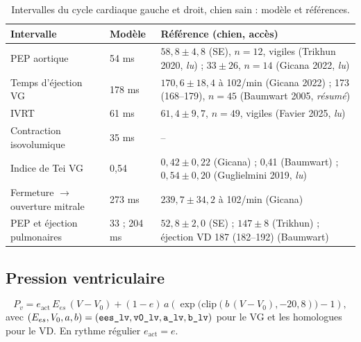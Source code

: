 \documentclass[10pt,a4paper]{article}
\newcommand{\vp}[1]{\text{\texttt{\detokenize{#1}}}}
\newcommand{\acc}[1]{\textsl{#1}}
\begin{document}
\begin{table}[h]\centering\small
\caption{Intervalles du cycle cardiaque gauche et droit, chien sain : modèle et références.}\label{tab:sti}
\begin{tabularx}{\linewidth}{@{}llL@{}}
\toprule
Intervalle & Modèle & Référence (chien, accès)\\
\midrule
PEP aortique & 54 ms & $58{,}8 \pm 4{,}8$ (SE), $n = 12$, vigiles (Trikhun 2020, \acc{lu}) ; $33 \pm 26$, $n = 14$ (Gicana 2022, \acc{lu})\\
Temps d'éjection VG & 178 ms & $170{,}6 \pm 18{,}4$ à 102/min (Gicana 2022) ; 173 (168--179), $n = 45$ (Baumwart 2005, \acc{résumé})\\
IVRT & 61 ms & $61{,}4 \pm 9{,}7$, $n = 49$, vigiles (Favier 2025, \acc{lu})\\
Contraction isovolumique & 35 ms & --\\
Indice de Tei VG & 0,54 & $0{,}42 \pm 0{,}22$ (Gicana) ; 0,41 (Baumwart) ; $0{,}54 \pm 0{,}20$ (Guglielmini 2019, \acc{lu})\\
Fermeture $\to$ ouverture mitrale & 273 ms & $239{,}7 \pm 34{,}2$ à 102/min (Gicana)\\
PEP et éjection pulmonaires & 33 ; 204 ms & $52{,}8 \pm 2{,}0$ (SE) ; $147 \pm 8$ (Trikhun) ; éjection VD 187 (182--192) (Baumwart)\\
\bottomrule
\end{tabularx}
\end{table}

\subsection{Pression ventriculaire}
\begin{equation}
P_v = e_\text{act}\,E_{es}\,(V - V_0) + (1 - e)\,a\left(\exp\bigl(\mathrm{clip}(b\,(V - V_0), -20, 8)\bigr) - 1\right),
\end{equation}
avec $(E_{es}, V_0, a, b) = (\vp{ees_lv}, \vp{v0_lv}, \vp{a_lv}, \vp{b_lv})$ pour le VG et les homologues \vp{_rv} pour le VD. En rythme régulier $e_\text{act} = e$.
\end{document}
